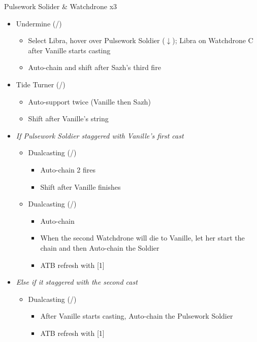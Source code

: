 \renewcommand{\first}{[1] Dualcasting (\rav/\rav)}
\renewcommand{\second}{[2] Tide Turner (\syn/\sab)}
\renewcommand{\third}{[3] Yin \& Yang (\rav/\med)}
\renewcommand{\fourth}{[4] Undermine (\rav/\sab)}
\renewcommand{\fifth}{[5] Dualcasting (\rav/\rav)}
\begin{battle}{Pulsework Solider \& Watchdrone x3}
\begin{itemize}
    \item \fourth
    \begin{itemize}
        \item Select Libra, hover over Pulsework Soldier ($\downarrow$); Libra on Watchdrone C after Vanille starts casting
        \item Auto-chain and shift after Sazh's third fire
    \end{itemize}
    \item \second
    \begin{itemize}
        \item Auto-support twice (Vanille then Sazh)
        \item Shift after Vanille's string
    \end{itemize}
    \item \textit{If Pulsework Soldier staggered with Vanille's first cast}
    \begin{itemize}
        \item \first
        \begin{itemize}
            \item Auto-chain 2 fires
            \item Shift after Vanille finishes
        \end{itemize}
        \item \fifth
        \begin{itemize}
            \item Auto-chain
            \item When the second Watchdrone will die to Vanille, let her start the chain and then Auto-chain the Soldier
            \item ATB refresh with [1]
        \end{itemize}
    \end{itemize}
    \item \textit{Else if it staggered with the second cast}
    \begin{itemize}
        \item \first
        \begin{itemize}
            \item After Vanille starts casting, Auto-chain the Pulsework Soldier
            \item ATB refresh with [1]
        \end{itemize}
    \end{itemize}
\end{itemize}
\end{battle}
\renewcommand{\first}{[1] Tri-disaster (\rav/\rav/\rav)}
\renewcommand{\fourth}{[4] Variety (\rav/\sab/\med)}

